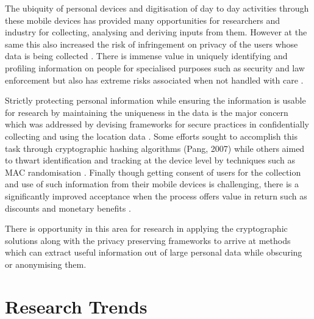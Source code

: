 The ubiquity of personal devices and digitisation of day to day activities through these mobile devices \citep{mcmeel2018} has provided many opportunities for researchers and industry for collecting, analysing and deriving inputs from them.
However at the same this also increased the risk of infringement on privacy of the users whose data is being collected \cite{saponas2007, krumm2009}.
There is immense value in uniquely identifying and profiling information on people for specialised purposes such as security \citep{cutter2006} and law enforcement \citep{dobson2003} but also has extreme risks associated when not handled with care \citep{vanwey2005}.

Strictly protecting personal information while ensuring the information is usable for research by maintaining the uniqueness in the data is the major concern which was addressed by devising frameworks for secure practices in confidentially collecting and using the location data \citep{duckham2006, tang2006, lane2014}.
Some efforts sought to accomplish this task through cryptographic hashing algorithms (Pang, 2007) while others aimed to thwart identification and tracking at the device level by techniques such as MAC randomisation \citep{gruteser2005, greenstein2008}.
Finally though getting consent of users for the collection and use of such information from their mobile devices is challenging, there is a significantly improved acceptance when the process offers value in return such as discounts and monetary benefits \citep{kobsa2014}.

There is opportunity in this area for research in applying the cryptographic solutions along with the privacy preserving frameworks to arrive at methods which can extract useful information out of large personal data while obscuring or anonymising them.

\section{Research Trends}

